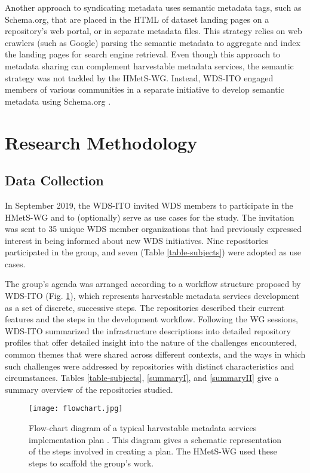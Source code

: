 \documentclass{interact}
\begin{document}
Another approach to syndicating metadata uses semantic metadata tags, such as Schema.org, that are placed in the HTML of dataset landing pages on a repository's web portal, or in separate metadata files. This strategy relies on web crawlers (such as Google) parsing the semantic metadata to aggregate and index the landing pages for search engine retrieval. Even though this approach to metadata sharing can complement harvestable metadata services, the semantic strategy was not tackled by the HMetS-WG. Instead, WDS-ITO engaged members of various communities in a separate initiative to develop semantic metadata using Schema.org \parencite{payne_how_2022}.

\section{Research Methodology}\label{method}

\subsection*{Data Collection}\label{data}
In September 2019, the WDS-ITO invited WDS members to participate in the HMetS-WG and to (optionally) serve as use cases for the study. The invitation was sent to 35 unique WDS member organizations that had previously expressed interest in being informed about new WDS initiatives. Nine repositories participated in the group, and seven (Table \ref{table-subjects}) were adopted as use cases.

The group's agenda was arranged according to a workflow structure proposed by WDS-ITO (Fig. \ref{flowchart}), which represents harvestable metadata services development as a set of discrete, successive steps. The repositories described their current features and the steps in the development workflow. Following the WG sessions, WDS-ITO summarized the infrastructure descriptions into detailed repository profiles \parencite{urquidi_diaz_harvestable_2022} that offer detailed insight into the nature of the challenges encountered, common themes that were shared across different contexts, and the ways in which such challenges were addressed by repositories with distinct characteristics and circumstances. Tables \ref{table-subjects}, \ref{summaryI}, and \ref{summaryII} give a summary overview of the repositories studied.

\begin{figure}
\centering
\texttt{[image: flowchart.jpg]}
\caption{Flow-chart diagram of a typical harvestable metadata services implementation plan \parencite{payne_steps_2020}. This diagram gives a schematic representation of the steps involved in creating a plan. The HMetS-WG used these steps to scaffold the group's work.} \label{flowchart}
\end{figure}
\end{document}
